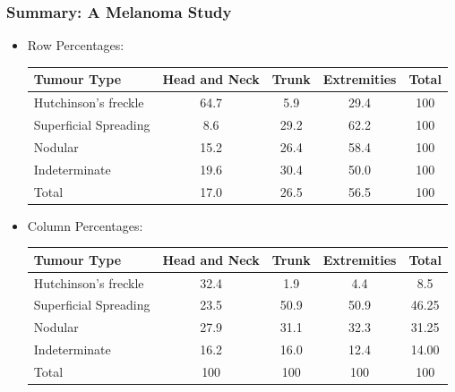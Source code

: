 \documentclass[oneside]{book}\usepackage[]{graphicx}\usepackage[svgnames]{xcolor}
\begin{document}
\subsubsection*{Summary: A Melanoma Study}
\begin{itemize}
      \item Row Percentages:
            \begin{table}[H]
                  \centering
                  \begin{tabular}{lcccc}
                        Tumour Type           & Head and Neck & Trunk & Extremities & Total \\
                        \midrule
                        Hutchinson's freckle  & 64.7          & 5.9   & 29.4        & 100   \\
                        Superficial Spreading & 8.6           & 29.2  & 62.2        & 100   \\
                        Nodular               & 15.2          & 26.4  & 58.4        & 100   \\
                        Indeterminate         & 19.6          & 30.4  & 50.0        & 100   \\
                        Total                 & 17.0          & 26.5  & 56.5        & 100
                  \end{tabular}
            \end{table}
      \item Column Percentages:
            \begin{table}[H]
                  \centering
                  \begin{tabular}{lcccc}
                        Tumour Type           & Head and Neck & Trunk & Extremities & Total \\
                        \midrule
                        Hutchinson's freckle  & 32.4          & 1.9   & 4.4         & 8.5   \\
                        Superficial Spreading & 23.5          & 50.9  & 50.9        & 46.25 \\
                        Nodular               & 27.9          & 31.1  & 32.3        & 31.25 \\
                        Indeterminate         & 16.2          & 16.0  & 12.4        & 14.00 \\
                        Total                 & 100           & 100   & 100         & 100
                  \end{tabular}
            \end{table}

\end{itemize}
\end{document}

